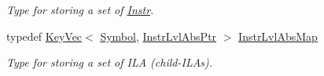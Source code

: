 \begin{DoxyCompactItemize}
\begin{DoxyCompactList}\small\item\em Type for storing a set of \mbox{\hyperlink{classilang_1_1_instr}{Instr}}. \end{DoxyCompactList}\item 
\mbox{\label{classilang_1_1_instr_lvl_abs_ae83eeb569c6f248835313806e6861e93}} 
typedef \mbox{\hyperlink{classilang_1_1_key_vec}{Key\+Vec}}$<$ \mbox{\hyperlink{classilang_1_1_symbol}{Symbol}}, \mbox{\hyperlink{classilang_1_1_instr_lvl_abs_a743fd98e5ad145d70cb0dabf8db0007c}{Instr\+Lvl\+Abs\+Ptr}} $>$ \mbox{\hyperlink{classilang_1_1_instr_lvl_abs_ae83eeb569c6f248835313806e6861e93}{Instr\+Lvl\+Abs\+Map}}
\begin{DoxyCompactList}\small\item\em Type for storing a set of I\+LA (child-\/\+I\+L\+As). \end{DoxyCompactList}\end{DoxyCompactItemize}
